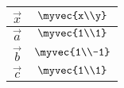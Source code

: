 \begin{tabular}{|c|c|}
\hline
$\vec{x}$ & $\myvec{x\\y}$\\
\hline
$\vec{a}$& $\myvec{1\\1}$\\
\hline
	$\vec{b}$ & $\myvec{1\\-1}$\\
	\hline
	$\vec{c}$ & $\myvec{1\\1}$\\
	\hline
\end{tabular}
